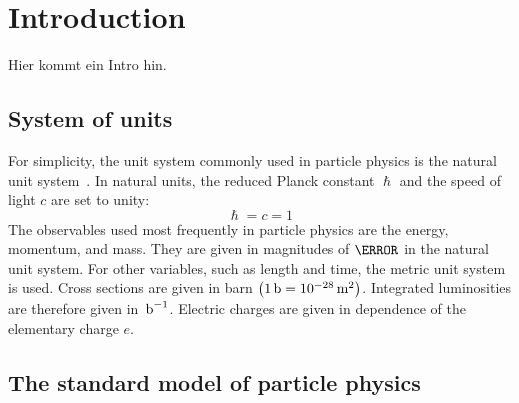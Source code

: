 \chapter{Introduction}\label{chap:introduction}
\minitoc
Hier kommt ein Intro hin.





\section{System of units}\label{sec:units}

For simplicity, the unit system commonly used in particle physics is the natural unit system~\cite{UnitSystem}. In natural units, the reduced Planck constant $\hslash$ and the speed of light $c$ are set to unity:
\begin{equation}
 \hslash=c=1
\end{equation}
The observables used most frequently in particle physics are the energy, momentum, and mass. They are given in magnitudes of $\eV$ in the natural unit system. For other variables, such as length and time, the metric unit system is used. Cross sections are given in barn $\left(1\,\text{b}=10^{-28}\,\text{m}^2\right)$. Integrated luminosities are therefore given in $\mbox{\ensuremath{\,\text{b}^\text{$-$1}}}$. Electric charges are given in dependence of the elementary charge $e$.

\section{The standard model of particle physics}\label{sec:SM}

